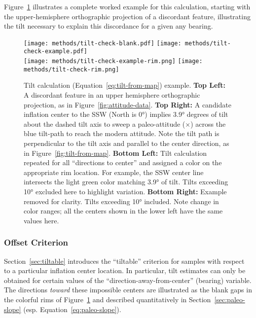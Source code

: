 Figure~\ref{fig:tilt-example} illustrates a complete worked example for this calculation, starting with the upper-hemisphere orthographic projection of a discordant feature, illustrating the tilt necessary to explain this discordance for a given any \acs{bearing}.
\begin{figure}
    \vspace{-19pt}
    \texttt{[image: methods/tilt-check-blank.pdf]}%
    \texttt{[image: methods/tilt-check-example.pdf]}\\
    \texttt{[image: methods/tilt-check-example-rim.png]}%
    \texttt{[image: methods/tilt-check-rim.png]}%
    \caption[Tilt calculation example]{Tilt calculation (Equation~\ref{eq:tilt-from-map}) example. \textbf{Top Left:} A discordant feature in an upper hemisphere orthographic projection, as in Figure~\ref{fig:attitude-data}. \textbf{Top Right:} A candidate inflation center to the SSW (North is \ang{0}) implies \ang{+3.9} degrees of tilt about the dashed tilt axis to sweep a paleo-attitude ($\times$) across the blue tilt-path to reach the modern attitude. Note the tilt path is perpendicular to the tilt axis and parallel to the center direction, as in Figure~\ref{fig:tilt-from-map}. \textbf{Bottom Left:} Tilt calculation repeated for all ``directions to center'' and assigned a color on the appropriate rim location. For example, the SSW center line intersects the light green color matching \ang{3.9} of tilt. Tilts exceeding \ang{10} excluded here to highlight variation. \textbf{Bottom Right:} Example removed for clarity. Tilts exceeding \ang{10} included. Note change in color ranges; all the centers shown in the lower left have the same values here.}
    \label{fig:tilt-example}
\end{figure}

\subsubsection{Offset Criterion}\label{sec:offset}

Section~\ref{sec:tiltable} introduces the ``tiltable'' criterion for samples with respect to a particular inflation center location. In particular, tilt estimates can only be obtained for certain values of the ``direction-away-from-center'' (\acs{bearing}) variable. The directions \emph{toward} these impossible centers are illustrated as the blank gaps in the colorful rims of Figure~\ref{fig:tilt-example} and described quantitatively in Section~\ref{sec:paleo-slope} (esp. Equation~\ref{eq:paleo-slope}).

